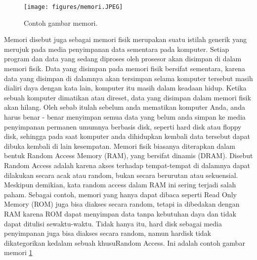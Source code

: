 ﻿%


\begin{figure}[ht]
\centerline{\texttt{[image: figures/memori.JPEG]}}
\caption{Contoh gambar memori.}
\label{memori}
\end{figure}

Memori disebut juga sebagai memori fisik merupakan suatu istilah generik yang merujuk pada media penyimpanan data sementara pada komputer. Setiap program dan data yang sedang diproses oleh prosesor akan disimpan di dalam memori fisik. Data yang disimpan pada memori fisik bersifat sementara, karena data yang disimpan di dalamnya akan tersimpan selama komputer tersebut masih dialiri daya dengan kata lain, komputer itu masih dalam keadaan hidup. Ketika sebuah komputer dimatikan atau direset, data yang disimpan dalam memori fisik akan hilang. Oleh sebab itulah sebelum anda mematikan komputer Anda, anda harus benar - benar menyimpan semua data yang belum anda simpan ke media penyimpanan permanen umumnya berbasis disk, seperti hard disk atau floppy disk, sehingga pada saat komputer anda dihidupkan kembali data tersebut dapat dibuka kembali di lain kesempatan. Memori fisik biasanya diterapkan dalam bentuk Random Access Memory (RAM), yang bersifat dinamis (DRAM). Disebut Random Access adalah karena akses terhadap tempat-tempat di dalamnya dapat dilakukan secara acak atau random, bukan secara berurutan atau sekuensial. Meskipun demikian, kata random access dalam RAM ini sering terjadi salah paham. Sebagai contoh, memori yang hanya dapat dibaca seperti Read Only Memory (ROM) juga bisa diakses secara random, tetapi ia dibedakan dengan RAM karena ROM dapat menyimpan data tanpa kebutuhan daya dan tidak dapat ditulisi sewaktu-waktu. Tidak hanya itu, hard disk sebagai media penyimpanan juga bisa diakses secara random, namun hardisk tidak dikategorikan kedalam sebuah khusuRandom Access. Ini adalah contoh gambar memori \ref{memori}

